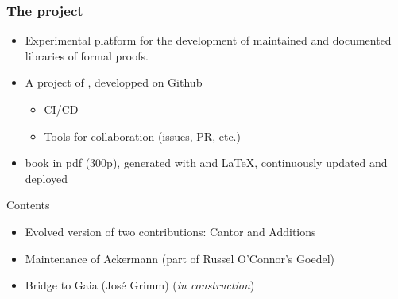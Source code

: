 \documentclass[10pt, fleqn]{beamer}
\begin{document}
\begin{frame}
  \frametitle{The \Hydras project}
  \begin{block}{}
    \begin{itemize}
   \item Experimental platform for the  development of \textcolor{lookcolor}{maintained} and \textcolor{lookcolor}{documented} libraries of formal proofs.
    \item A project of \community, developped on Github
      \begin{itemize}
      \item CI/CD
        \item Tools for collaboration (issues, PR, etc.)
        \end{itemize}
           \item book in pdf (300p), generated  with \textcolor{lookcolor}{\alectr} and \LaTeX, continuously updated and deployed
    \end{itemize}
  \end{block}
  \begin{block}{Contents}
    \begin{itemize}
    \item Evolved version  of two contributions: \textcolor{plugincolor}{Cantor} and \textcolor{plugincolor}{Additions}
    \item Maintenance of \textcolor{plugincolor}{Ackermann}
      (part of Russel O'Connor's \textcolor{plugincolor}{Goedel})
    \item Bridge to \textcolor{plugincolor}{Gaia} (José Grimm) (\emph{in construction})
   
    \end{itemize}
  \end{block}
 
\end{frame}
\end{document}

